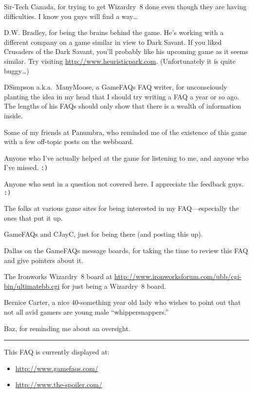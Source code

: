 \documentclass[11pt]{report}
\providecommand{\tightlist}{%
  \setlength{\itemsep}{0pt}\setlength{\parskip}{0pt}}
\newcommand{\WviiNeedSpace}{\Needspace*{4\baselineskip+\parskip}}
\begin{document}
Sir-Tech Canada, for trying to get Wizardry~8 done even though they are
having difficulties. I know you guys will find a way\ldots{}

D.W. Bradley, for being the brains behind the game. He's working with a
different company on a game similar in view to Dark Savant. If you liked
Crusaders of the Dark Savant, you'll probably like his upcoming game as
it seems similar. Try visiting \url{http://www.heuristicpark.com}.
(Unfortunately it is quite buggy\ldots{})

DSimpson a.k.a.\ ManyMoose, a GameFAQs FAQ writer, for unconsciously
planting the idea in my head that I should try writing a FAQ a year or
so ago. The lengths of his FAQs should only show that there is a wealth
of information inside.

Some of my friends at Panumbra, who reminded me of the existence of this
game with a few off-topic posts on the webboard.

Anyone who I've actually helped at the game for listening to me, and
anyone who I've missed. \verb|:)|

Anyone who sent in a question not covered here. I appreciate the
feedback guys. \verb|:)|

The folks at various game sites for being interested in my
FAQ---especially the ones that put it up.

GameFAQs and CJayC, just for being there (and posting this up).

Dallas on the GameFAQs message boards, for taking the time to review
this FAQ and give pointers about it.

The Ironworks Wizardry~8 board at
\url{http://www.ironworksforum.com/ubb/cgi-bin/ultimatebb.cgi} for just
being a Wizardry~8 board.

Bernice Carter, a nice 40-something year old lady who wishes to point
out that not all avid gamers are young male ``whippersnappers.''

Baz, for reminding me about an oversight.

\begin{center}\rule{0.5\linewidth}{\linethickness}\end{center}

\WviiNeedSpace{}This FAQ is currently displayed at:%
\begin{itemize}
\tightlist
\item
  \url{http://www.gamefaqs.com/}
\item
  \url{http://www.the-spoiler.com/}
\end{itemize}
\end{document}

